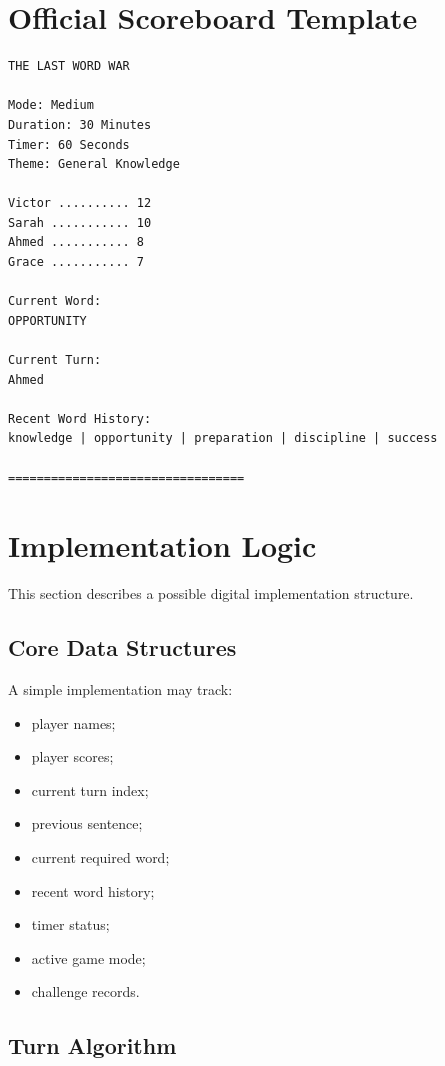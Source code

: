 \documentclass[11pt,a4paper]{article}
\begin{document}
\section{Official Scoreboard Template}

\begin{verbatim}
THE LAST WORD WAR

Mode: Medium
Duration: 30 Minutes
Timer: 60 Seconds
Theme: General Knowledge

Victor .......... 12
Sarah ........... 10
Ahmed ........... 8
Grace ........... 7

Current Word:
OPPORTUNITY

Current Turn:
Ahmed

Recent Word History:
knowledge | opportunity | preparation | discipline | success

=================================
\end{verbatim}

\section{Implementation Logic}

This section describes a possible digital implementation structure.

\subsection{Core Data Structures}

A simple implementation may track:

\begin{itemize}
    \item player names;
    \item player scores;
    \item current turn index;
    \item previous sentence;
    \item current required word;
    \item recent word history;
    \item timer status;
    \item active game mode;
    \item challenge records.
\end{itemize}

\subsection{Turn Algorithm}
\end{document}
